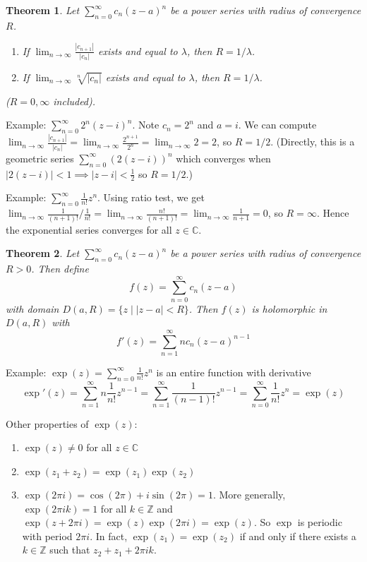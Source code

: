 \documentclass{article}
\theoremstyle{plain}
\newtheorem{theorem}{Theorem}
\theoremstyle{remark}
\newcommand{\Z}{{\mathbb Z}}
\newcommand{\C}{{\mathbb C}}
\begin{document}
\begin{theorem}
	Let $\sum_{n=0}^\infty c_n(z-a)^n$ be a power series with radius of convergence $R$.
	\begin{enumerate}
		\item[(1)] If $\lim_{n\to\infty} \frac{|c_{n+1}|}{|c_n|}$ exists
			and equal to $\lambda$, then $R = 1/\lambda$.
		\item[(2)] If $\lim_{n\to\infty} \sqrt[n]{|c_n|}$ exists
			and equal to $\lambda$, then $R = 1/\lambda$.
	\end{enumerate}
	($R = 0,\infty$ included).
\end{theorem}

Example: $\sum_{n=0}^\infty 2^n(z-i)^n$.
Note $c_n = 2^n$ and $a = i$.
We can compute $\lim_{n\to\infty} \frac{|c_{n+1}|}{|c_n|}
= \lim_{n\to\infty} \frac{2^{n+1}}{2^n} = \lim_{n\to\infty} 2= 2$,
so $R = 1/2$.
(Directly, this is a geometric series $\sum_{n=0}^\infty (2(z-i))^n$ which converges
when $|2(z-i)| < 1 \implies |z-i| < \frac12$ so $R = 1/2$.)

Example: $\sum_{n=0}^\infty \frac{1}{n!} z^n$.
Using ratio test, we get $\lim_{n\to\infty}\frac{1}{(n+1)!}/\frac{1}{n!}
= \lim_{n\to\infty} \frac{n!}{(n+1)!} = \lim_{n \to \infty} \frac{1}{n+1} = 0$,
so $R = \infty$.
Hence the exponential series converges for all $z \in \C$.

\begin{theorem}
	Let $\sum_{n=0}^\infty c_n(z-a)^n$ be a power series
	with radius of convergence $R > 0$. Then define
	\[
		f(z) = \sum_{n=0}^\infty c_n(z-a)
	\]
	with domain $D(a,R) = \{z \mid |z-a| < R\}$.
	Then $f(z)$ is holomorphic in $D(a,R)$ with
	\[
		f'(z) = \sum_{n=1}^\infty nc_n(z-a)^{n-1}
	\]
\end{theorem}

Example: $\exp(z) = \sum_{n=0}^\infty \frac{1}{n!} z^n$ is an entire function
with derivative
\[
	\exp'(z) = \sum_{n=1}^\infty n\frac{1}{n!} z^{n-1}
	= \sum_{n=1}^\infty \frac{1}{(n-1)!} z^{n-1} = \sum_{n=0}^\infty \frac{1}{n!}z^n = \exp(z)
\]

Other properties of $\exp(z)$:
\begin{enumerate}
	\item $\exp(z) \neq 0$ for all $z \in \C$
	\item $\exp(z_1 + z_2) = \exp(z_1)\exp(z_2)$
	\item $\exp(2\pi i) = \cos(2\pi) + i\sin(2\pi) = 1$.
		More generally, $\exp(2\pi i k) = 1$ for all $k \in \Z$
		and $\exp(z + 2\pi i) = \exp(z)\exp(2\pi i) = \exp(z)$.
		So $\exp$ is periodic with period $2 \pi i$.
		In fact, $\exp(z_1) = \exp(z_2)$ if and only if
		there exists a $k \in \Z$ such that $z_2 + z_1 + 2\pi i k$.
\end{enumerate}
\end{document}
